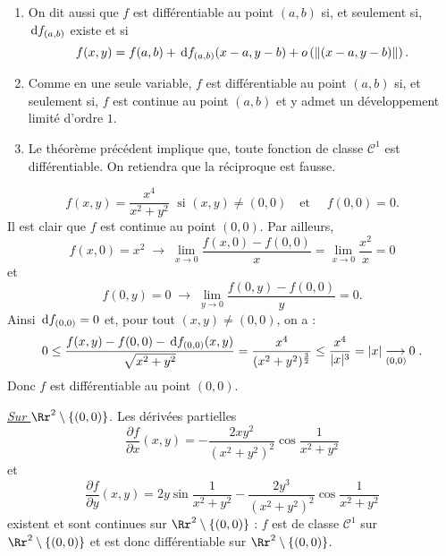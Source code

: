 \documentclass[class=report,crop=false]{standalone}
\begin{document}
\vskip6mm

\begin{enumerate}
\item On dit aussi que $f$ est différentiable au point $(a,b)$ si, et seulement si, $\,\mathrm{d} f_{(a,b)}$ existe et si
$$f(x,y)=f(a,b)+\,\mathrm{d} f_{(a,b)}(x-a,y-b)+o\left(\|(x-a,y-b)\|\right).$$
\item Comme en une seule variable, $f$ est différentiable au point $(a,b)$ si, et seulement si, $f$ est continue au point $(a,b)$ et y admet un développement limité d'ordre $1$.
\item Le théorème précédent implique que, toute fonction de classe $\mathscr{C}^1$ est différentiable. On retiendra que la réciproque est fausse.
\end{enumerate}

\vskip6mm

$$f(x,y)=\frac{x^4}{x^2+y^2}\;\mbox{ si }(x,y)\neq (0,0)\quad \mbox{et }\quad f(0,0)=0.$$
Il est clair que $f$ est continue au point $(0,0)$. Par ailleurs,
$$f(x,0)=x^2\; \rightarrow \; \lim _{x\to 0}\frac{f(x,0)-f(0,0)}{x}=\lim _{x\to 0}\frac{x^2}{x}=0$$
et 
$$f(0,y)=0\; \rightarrow \; \lim _{y\to 0}\frac{f(0,y)-f(0,0)}{y}=0.$$
Ainsi $\,\mathrm{d} f_{(0,0)}=0$ et, pour tout $(x,y)\neq (0,0)$, on a :
$$0\leq \frac{f(x,y)-f(0,0)-\,\mathrm{d} f_{(0,0)}(x,y)}{\sqrt{x^2+y^2}}=\frac{x^4}{(x^2+y^2)^{\frac{3}{2}}}\leq \frac{x^4}{|x|^3}=|x|\underset{(0,0)\; \; \; }{\longrightarrow 0}.$$
Donc $f$ est différentiable au point $(0,0)$.

\vskip6mm

 
\vskip4mm

\noindent \underline{\it Sur $\Rr^2\setminus \{(0,0)\}$}. Les dérivées partielles 
$$\frac{\partial f}{\partial x}(x,y)=-\frac{2xy^2}{(x^2+y^2)^2}\cos \frac{1}{x^2+y^2}$$
et
$$\frac{\partial f}{\partial y}(x,y)=2y\sin \frac{1}{x^2+y^2}-\frac{2y^3}{(x^2+y^2)^2}\cos \frac{1}{x^2+y^2}$$
existent et sont continues sur $\Rr^2\setminus \{(0,0)\}$ : $f$ est de classe $\mathscr{C}^1$ sur $\Rr^2\setminus \{(0,0)\}$ et est donc différentiable sur $\Rr^2\setminus \{(0,0)\}$.
\end{document}

